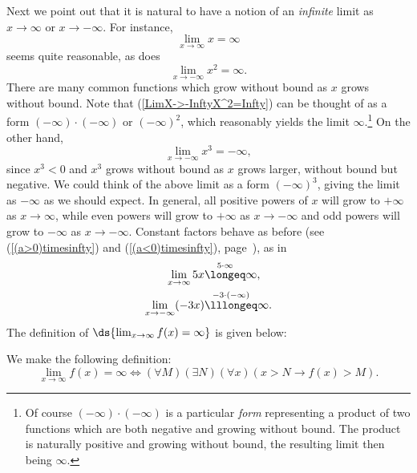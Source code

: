 Next we point out that it is natural to have a notion
of an {\it infinite} limit as $x\to\infty$ or $x\to-\infty$.
For instance,
\begin{equation}\lim_{x\to\infty}x=\infty\end{equation}
seems quite reasonable, as does
\begin{equation}\lim_{x\to-\infty}x^2=\infty.\label{LimX->-InftyX^2=Infty}
\end{equation}
There are many common functions which grow without bound
as $x$ grows without bound.  Note that 
(\ref{LimX->-InftyX^2=Infty}) can be thought of as
a form $(-\infty)\cdot(-\infty)$ or $(-\infty)^2$,
which reasonably yields the limit $\infty$.\footnote{%
Of course $(-\infty)\cdot(-\infty)$ is a particular {\it form} 
representing  a product
of two functions which are both negative and growing without bound.
The product is naturally positive and growing without bound, 
the resulting limit then being $\infty$.
}  On the other hand,
\begin{equation}
\lim_{x\to-\infty}x^3=-\infty,\end{equation}
since $x^3<0$ and $x^3$ grows without bound as 
$x$ grows larger, without bound but negative.
We could think of the above limit as a form
$(-\infty)^3$, giving the limit as $-\infty$ as
we should expect.  In general, all positive 
powers of $x$ will grow to $+\infty$ as $x\to\infty$,
while even powers will grow to $+\infty$ as $x\to-\infty$
and odd powers will grow to $-\infty$ as $x\to-\infty$.\footnotemark
{}
Constant factors behave as before (see (\ref{(a>0)timesinfty})
and (\ref{(a<0)timesinfty}), page~\pageref{(a<0)timesinfty}), as in 
\begin{align*}
\lim_{x\to\infty}5x&\overset{5\cdot\infty}{\longeq}\infty,\\
\lim_{x\to-\infty}(-3x)&\overset{-3\cdot(-\infty)}{\lllongeq}\infty.
\end{align*}
The definition of $\ds{\lim_{x\to\infty}f(x)=\infty}$ is
given below:
\begin{definition}We make the following definition:
\begin{equation}\lim_{x\to\infty}f(x)=\infty
\iff (\forall M)(\exists N)(\forall x)(x>N\longrightarrow f(x)>M).
\label{EqForDefOfLimX->Infty=Infty}\end{equation}
\label{DefineLimAtInfinityToBeInfinity}
\end{definition}
